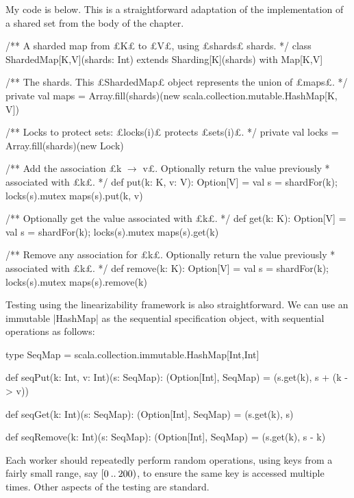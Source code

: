 \begin{answerS}
My code is below.  This is a straightforward adaptation of the
implementation of a shared set from the body of the chapter. 

 
\begin{scala}
/** A sharded map from £K£ to £V£, using £shards£ shards. */
class ShardedMap[K,V](shards: Int) extends Sharding[K](shards) with Map[K,V]{
  /** The shards.  This £ShardedMap£ object represents the union of £maps£. */ 
  private val maps = 
    Array.fill(shards)(new scala.collection.mutable.HashMap[K, V])

  /** Locks to protect sets: £locks(i)£ protects £sets(i)£. */
  private val locks = Array.fill(shards)(new Lock)

  /** Add the association £k $\rightarrow$ v£.  Optionally return the value previously
    * associated with £k£. */
  def put(k: K, v: V): Option[V] = {
    val s = shardFor(k); locks(s).mutex{ maps(s).put(k, v) }
  }

  /** Optionally get the value associated with £k£. */
  def get(k: K): Option[V] = {
    val s = shardFor(k); locks(s).mutex{ maps(s).get(k) }
  }

  /** Remove any association for £k£.  Optionally return the value previously
    * associated with £k£. */
  def remove(k: K): Option[V] = {
    val s = shardFor(k); locks(s).mutex{ maps(s).remove(k) }
  }
}
\end{scala}

Testing using the linearizability framework is also straightforward.  We can
use an immutable |HashMap| as the sequential specification object, with
sequential operations as follows:
%
\begin{scala}
  type SeqMap = scala.collection.immutable.HashMap[Int,Int]

  def seqPut(k: Int, v: Int)(s: SeqMap): (Option[Int], SeqMap) = 
    (s.get(k), s + (k -> v))

  def seqGet(k: Int)(s: SeqMap): (Option[Int], SeqMap) = 
    (s.get(k), s)

  def seqRemove(k: Int)(s: SeqMap): (Option[Int], SeqMap) = 
    (s.get(k), s - k)
\end{scala}

Each worker should repeatedly perform random operations, using keys from a
fairly small range, say $[0 \mathbin{..} 200)$, to ensure the same key is
accessed multiple times.  Other aspects of the testing are standard.
\end{answerS}
